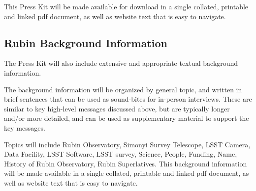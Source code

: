 This Press Kit will be made available for download in a single collated, printable and linked pdf document,
as well as website text that is easy to navigate.


\subsection{Rubin Background Information} 

The Press Kit will also include extensive and appropriate textual background information.

The background information will be organized by general topic, and written in brief sentences that can be used as
sound-bites for in-person interviews. These are similar to key high-level messages discussed above, but are typically
longer and/or more detailed, and can be used as supplementary material to support the key messages.

Topics will include Rubin Observatory, Simonyi Survey Telescope, LSST Camera, Data Facility, LSST Software, LSST survey,
Science, People, Funding, Name, History of Rubin Observatory, Rubin Superlatives. This background information will
be made available in a single collated, printable and linked pdf document, as well as website text that is easy to navigate. 

  